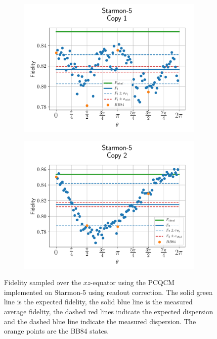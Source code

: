 \begin{figure}[H]
  \centering
  \begin{subfigure}{.5\textwidth}
    \centering
    \includegraphics[width=\textwidth]{Figures/PhaseCovariant/Starmon/OnlyEquator/results_starmon_corrected_copy1.png}
    \label{fig:pc_corrected_starmon_equator_1}
  \end{subfigure}%
  \begin{subfigure}{.5\textwidth}
    \centering
    \includegraphics[width=\textwidth]{Figures/PhaseCovariant/Starmon/OnlyEquator/results_starmon_corrected_copy2.png}
    \label{fig:pc_corrected_starmon_equator_2}
  \end{subfigure}
  \vspace{-0.5cm}
  \caption{Fidelity sampled over the $xz$-equator using the PCQCM implemented on Starmon-5 using readout correction.
  The solid green line is the expected fidelity, the solid blue line is the measured average fidelity, the dashed red lines indicate the expected dispersion and the dashed blue line indicate the measured dispersion. The orange points are the BB84 states.}
  \label{fig:pc_corrected_starmon_equator}
\end{figure}

